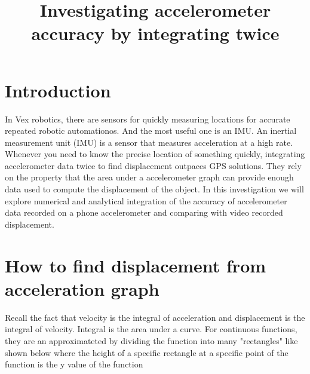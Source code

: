\documentclass[12pt]{article}
\title{Investigating accelerometer accuracy by integrating twice}
\newcommand{\diff}{\ensuremath{\operatorname{d}\!}}
\begin{document}
\maketitle
\pagebreak
    \section{Introduction}
        In Vex robotics, there are sensors for quickly measuring locations for accurate repeated robotic automationos. And the most useful one is an IMU. An inertial measurement unit (IMU) is a sensor that measures acceleration at a high rate. Whenever you need to know the precise location of something quickly, integrating accelerometer data twice to find displacement outpaces GPS solutions. They rely on the property that the area under a accelerometer graph can provide enough data used to compute the displacement of the object. In this investigation we will explore numerical and analytical integration of the accuracy of accelerometer data recorded on a phone accelerometer and comparing with video recorded displacement.

\section{How to find displacement from acceleration graph}
%
%

Recall the fact that velocity is the integral of acceleration and displacement is the integral of velocity. Integral is the area under a curve. For continuous functions, they are an approximateted by dividing the function into many "rectangles" like shown below where the height of a specific rectangle at a specific point of the function is the y value of the function
\end{document}
